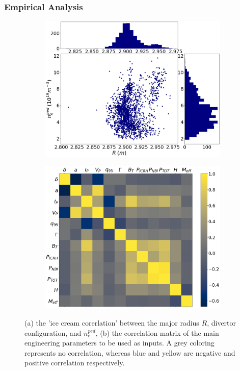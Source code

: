 \documentclass[a4paper, twoside, final, 12pt]{article}
\begin{document}
\subsubsection{Empirical Analysis}
\begin{figure}
        \centering
        \begin{subfigure}{0.5\linewidth}
                \centering
                \includegraphics[scale=0.2]{./src/R_vs_NEPED_matplotlib}
                \caption{}
                \label{subfig:rvsneped}
        \end{subfigure} \hfill
        \begin{subfigure}{0.45\linewidth}
                \centering
                \includegraphics[scale=0.2]{./src/input_correlations}
                \caption{}
                \label{subfig:corr_shit}
        \end{subfigure}
	\caption{(a) the 'ice cream corerlation' between the major radius $R$, divertor configuration, and $n_e^{ped}$,  (b) the correlation matrix of the main engineering parameters to be used as inputs. A grey coloring represents no correlation, whereas blue and yellow are negative and positive correlation respectively.  }
	\label{fig:emperical}
\end{figure}
\end{document}
